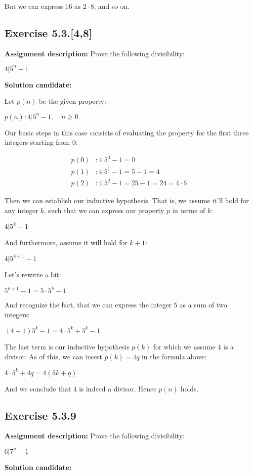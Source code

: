 \documentclass{report}
\newcommand{\cent}[1]{\begin{center}#1\end{center}}
\newcommand{\mAlign}[1]{\begin{align*}#1\end{align*}}
\newcommand{\assignmentDescription}{\textbf{Assignment description: }}
\newcommand{\solution}{\textbf{Solution candidate: }}
\newcommand{\QED}{\boxed{}}
\newcommand{\Exercise}[1]{\subsection{Exercise #1}}
\begin{document}
 	But we can express $16$ as $2 \cdot 8$, and so on.\\
 	
 	\QED
 	
 	\Exercise{5.3.[4,8]}
 	
 	\assignmentDescription
 	Prove the following divisibility:
 	\newcommand{\givenFormula}[1]{\ensuremath{4|5^{#1} -1}}
 	\cent{\givenFormula{n}}
 	
 	\solution
 	
 	Let $p(n)$ be the given property:
 	
 	\cent{$p(n) : \givenFormula{n}, \quad n \geq 0$}
 	
 	
 	Our basic steps in this case consists of evaluating the property for the first three integers starting from 0:
 	
 	\mAlign{
 		p(0) & :4|5^0 -1 = 0 \\
 		p(1) &: 4|5^1 -1 = 5-1 = 4 \\
 		p(2) &: 4|5^2 -1 = 25-1 = 24 = 4 \cdot 6
 	}
 	
 	Then we can establish our inductive hypothesis. That is, we assume it'll hold for any integer $k$, such that we can express our property $p$ in terms of $k$:
 	
 	\cent{\givenFormula{k}}
 	
 	And furthermore, assume it will hold for $k+1$:
 	
 	\cent{$\givenFormula{k+1}$}
 	
 	Let's rewrite a bit:
 	
	\cent{$5^{k+1}-1 = 5 \cdot  5^k -1$}
	
	And recognize the fact, that we can express the integer $5$ as a sum of two integers:
	
	\cent{$ (4+1)5^k -1 = 4 \cdot 5^k + 5^k - 1$}
	
	The last term is our inductive hypothesis $p(k)$ for which we assume 4 is a divisor. As of this, we can insert $p(k) = 4q$ in the formula above:
	
	\cent{ $ 4 \cdot 5^k + 4q = 4(5k + q)$}
	
	And we conclude that 4 is indeed a divisor. Hence $p(n)$ holds.\\
	
	\QED
	
	
 	\Exercise{5.3.9}
 	
 	\assignmentDescription
 	Prove the following divisibility:
 	
 	\cent{$6|7^n-1$}
 	
 	\solution
 	
\end{document}
